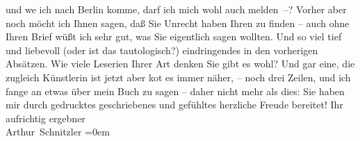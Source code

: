 \begin{ledgroupsized}[t]{13cm}
               und we{\geminationn} ich nach Berlin komme, darf ich mich wohl auch melden –? Vorher aber noch möcht ich
               Ihnen sagen, daß Sie Unrecht haben Ihren \label{K_M178-11v}\label{K_M178-11h} zu finden – auch ohne Ihren Brief {\pb}wüßt ich sehr gut, was Sie eigentlich
               sagen wollten. Und so viel tief und liebevoll (oder ist das tautologisch?)
               eindringendes in den vorherigen Absätzen. Wie
               viele Leseri{\geminationn}en Ihrer Art denken Sie gibt es wohl? Und
               gar eine, die zugleich Künstlerin ist { }{\dotsfive} jetzt aber ko{\geminationm}t es immer
               näher, – noch drei Zeilen, und ich fange an etwas über mein {\pb}Buch zu sagen – daher nicht
               mehr als dies: Sie haben mir durch gedrucktes geschriebenes und
               gefühltes herzliche Freude bereitet!\pend
           \pstart
           Ihr aufrichtig ergebner{\\[\baselineskip]}\spacefill\mbox{Arthur Schnitzler}\pend
           \leftskip=0em{}
         
         \endnumbering{}\end{ledgroupsized}  \newcommand{\dateiname}{L02583}\newcommand{\titel}{Arthur Schnitzler an Auguste Hauschner, 23. 1. 1909}\newcommand{\editorInnen}{Martin Anton Müller und Laura Untner}
      